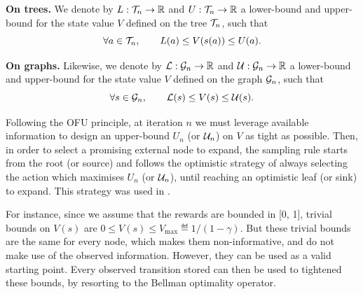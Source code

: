 \begin{definition}
	\begin{leftbar}[defnbar]
	{\textbf{On trees.}} We denote by $L:\mathcal{T}_n \rightarrow \mathbb{R}$ and  $U:\mathcal{T}_n \rightarrow \mathbb{R}$ a lower-bound and upper-bound for the state value $V$ defined on the tree $\mathcal{T}_n$, such that
	\begin{equation*}
	\forall a\in\mathcal{T}_n, \qquad L(a) \leq V(s(a)) \leq U(a).
	\end{equation*}
	
	{\textbf{On graphs.}} Likewise, we denote by $\mathcal{L}:\mathcal{G}_n \rightarrow \mathbb{R}$ and  $\mathcal{U}:\mathcal{G}_n \rightarrow \mathbb{R}$ a lower-bound and upper-bound for the state value $V$ defined on the graph $\mathcal{G}_n$, such that
	\begin{equation*}
	\forall s\in\mathcal{G}_n, \qquad \mathcal{L}(s) \leq V(s) \leq \mathcal{U}(s).
	\end{equation*}
	\end{leftbar}
\end{definition}

Following the OFU principle, at iteration $n$ we must leverage available information to design an upper-bound $U_n$ (or $\mathcal{U}_n$) on $V$ as tight as possible. Then, in order to select a promising external node to expand, the sampling rule starts from the root (or source) and follows the optimistic strategy of always selecting the action which maximises $U_n$ (or $\mathcal{U}_n$), until reaching an optimistic leaf (or sink) to expand. This strategy was used in \citep[e.g.][]{Kocsis06UCT, Hren2008optimistic, Bubeck2010open, Busoniu2012optimistic}.

For instance, since we assume that the rewards are bounded in [0, 1], trivial bounds on $V(s)$ are
$0 \leq V(s) \leq V_{\max} \eqdef {1}/({1-\gamma})$. But these trivial bounds are the same for every node, which makes them non-informative, and do not make use of the observed information. However, they can be used as a valid starting point. Every observed transition stored can then be used to tightened these bounds, by resorting to the Bellman optimality operator.

